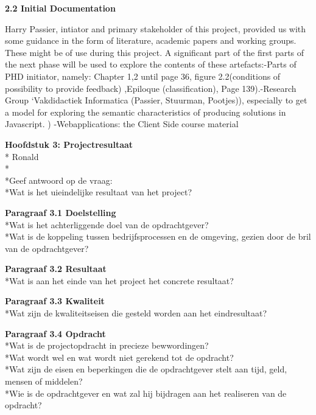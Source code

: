\documentclass{article}
\begin{document}
\textbf{2.2 Initial Documentation}

\noindent
Harry Passier, intiator and primary stakeholder of this project, provided us with some guidance in the form of literature, academic papers and working groups. These might be of use during this project. A significant part of the first parts of the next phase will be used to explore the contents of these artefacts:\newline -Parts of PHD initiator, namely: Chapter 1,2 until page 36, figure 2.2(conditions of possibility to provide feedback) ,Epiloque (classification), Page 139).\newline -Research Group ‘Vakdidactiek Informatica (Passier, Stuurman, Pootjes)), especially to get a model for exploring the semantic characteristics of producing solutions in Javascript. ) \newline -Webapplications: the Client Side course material

\textbf{Hoofdstuk 3: Projectresultaat}
\\* Ronald
\\*
\\*Geef antwoord op de vraag:
\\*Wat is het uieindelijke resultaat van het project?
\newline

\noindent
\textbf{Paragraaf 3.1 Doelstelling}
\\*Wat is het achterliggende doel van de opdrachtgever?
\\*Wat is de koppeling tussen bedrijfsprocessen en de omgeving, gezien door de bril van de opdrachtgever?
\newline

\noindent
\textbf{Paragraaf 3.2 Resultaat}
\\*Wat is aan het einde van het project het concrete resultaat?
\newline

\noindent
\textbf{Paragraaf 3.3 Kwaliteit}
\\*Wat zijn de kwaliteitseisen die gesteld worden aan het eindresultaat?
\newline

\noindent
\textbf{Paragraaf 3.4 Opdracht}
\\*Wat is de projectopdracht in precieze bewwordingen?
\\*Wat wordt wel en wat wordt niet gerekend tot de opdracht?
\\*Wat zijn de eisen en beperkingen die de opdrachtgever stelt aan tijd, geld, mensen of middelen?
\\*Wie is de opdrachtgever en wat zal hij bijdragen aan het realiseren van de opdracht?
\newline
\end{document}
